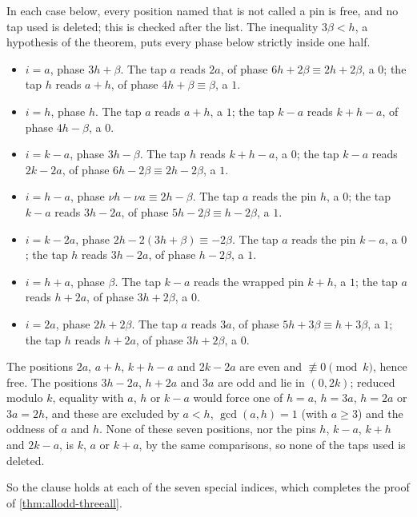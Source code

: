In each case below, every position named that is not called a pin is free,
and no tap used is deleted; this is checked after the list. The
inequality $3\beta<h$, a hypothesis of the theorem, puts every
phase below strictly inside one half.
\begin{itemize}
\item $i=a$, phase $3h+\beta$. The tap $a$ reads $2a$, of phase
$6h+2\beta\equiv2h+2\beta$, a $0$; the tap $h$ reads $a+h$, of phase
$4h+\beta\equiv\beta$, a $1$.
\item $i=h$, phase $h$. The tap $a$ reads $a+h$, a $1$; the tap $k-a$ reads
$k+h-a$, of phase $4h-\beta$, a $0$.
\item $i=k-a$, phase $3h-\beta$. The tap $h$ reads $k+h-a$, a $0$; the tap
$k-a$ reads $2k-2a$, of phase $6h-2\beta\equiv2h-2\beta$, a $1$.
\item $i=h-a$, phase $\nu h-\nu a\equiv2h-\beta$. The tap $a$ reads the pin $h$, a
$0$; the tap $k-a$ reads $3h-2a$, of phase $5h-2\beta\equiv h-2\beta$, a
$1$.
\item $i=k-2a$, phase $2h-2(3h+\beta)\equiv-2\beta$. The tap $a$ reads the pin
$k-a$, a $0$; the tap $h$ reads $3h-2a$, of phase $h-2\beta$, a $1$.
\item $i=h+a$, phase $\beta$. The tap $k-a$ reads the wrapped pin $k+h$, a
$1$; the tap $a$ reads $h+2a$, of phase $3h+2\beta$, a $0$.
\item $i=2a$, phase $2h+2\beta$. The tap $a$ reads $3a$, of phase
$5h+3\beta\equiv h+3\beta$, a $1$; the tap $h$ reads $h+2a$, of phase
$3h+2\beta$, a $0$.
\end{itemize}
The positions $2a$, $a+h$, $k+h-a$ and $2k-2a$ are even and $\not\equiv0\pmod
k$, hence free. The positions $3h-2a$, $h+2a$ and $3a$ are odd and lie in
$(0,2k)$; reduced modulo $k$, equality with $a$, $h$ or $k-a$ would force one
of $h=a$, $h=3a$, $h=2a$ or $3a=2h$, and these are excluded by
$a<h$, $\gcd(a,h)=1$ (with $a\ge3$) and the oddness of $a$ and $h$. None of
these seven positions, nor the pins $h$, $k-a$, $k+h$ and $2k-a$, is $k$, $a$
or $k+a$, by the same comparisons, so none
of the taps used is deleted.

So the clause holds at each of the seven special indices, which completes
the proof of \autoref{thm:allodd-threeall}.
